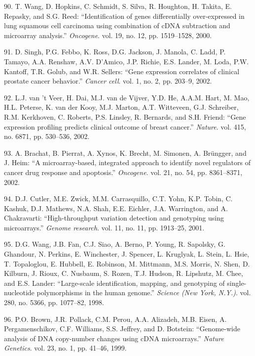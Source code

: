 \documentclass[12pt,twoside]{reedthesis}
\theoremstyle{definition}
\theoremstyle{definition}
\theoremstyle{remark}
\begin{document}
  \hypertarget{ref-Wang2000}{}
  90. T. Wang, D. Hopkins, C. Schmidt, S. Silva, R. Houghton, H. Takita,
  E. Repasky, and S.G. Reed: ``Identification of genes differentially
  over-expressed in lung squamous cell carcinoma using combination of cDNA
  subtraction and microarray analysis.'' \emph{Oncogene}. vol. 19, no. 12,
  pp. 1519--1528, 2000.
  
  \hypertarget{ref-Singh2002}{}
  91. D. Singh, P.G. Febbo, K. Ross, D.G. Jackson, J. Manola, C. Ladd, P.
  Tamayo, A.A. Renshaw, A.V. D'Amico, J.P. Richie, E.S. Lander, M. Loda,
  P.W. Kantoff, T.R. Golub, and W.R. Sellers: ``Gene expression correlates
  of clinical prostate cancer behavior.'' \emph{Cancer cell}. vol. 1, no.
  2, pp. 203--9, 2002.
  
  \hypertarget{ref-VantVeer2002}{}
  92. L.J. van 't Veer, H. Dai, M.J. van de Vijver, Y.D. He, A.A.M. Hart,
  M. Mao, H.L. Peterse, K. van der Kooy, M.J. Marton, A.T. Witteveen, G.J.
  Schreiber, R.M. Kerkhoven, C. Roberts, P.S. Linsley, R. Bernards, and
  S.H. Friend: ``Gene expression profiling predicts clinical outcome of
  breast cancer.'' \emph{Nature}. vol. 415, no. 6871, pp. 530--536, 2002.
  
  \hypertarget{ref-Brachat2002}{}
  93. A. Brachat, B. Pierrat, A. Xynos, K. Brecht, M. Simonen, A.
  Brüngger, and J. Heim: ``A microarray-based, integrated approach to
  identify novel regulators of cancer drug response and apoptosis.''
  \emph{Oncogene}. vol. 21, no. 54, pp. 8361--8371, 2002.
  
  \hypertarget{ref-Cutler2001}{}
  94. D.J. Cutler, M.E. Zwick, M.M. Carrasquillo, C.T. Yohn, K.P. Tobin,
  C. Kashuk, D.J. Mathews, N.A. Shah, E.E. Eichler, J.A. Warrington, and
  A. Chakravarti: ``High-throughput variation detection and genotyping
  using microarrays.'' \emph{Genome research}. vol. 11, no. 11, pp.
  1913--25, 2001.
  
  \hypertarget{ref-Wang1998}{}
  95. D.G. Wang, J.B. Fan, C.J. Siao, A. Berno, P. Young, R. Sapolsky, G.
  Ghandour, N. Perkins, E. Winchester, J. Spencer, L. Kruglyak, L. Stein,
  L. Hsie, T. Topaloglou, E. Hubbell, E. Robinson, M. Mittmann, M.S.
  Morris, N. Shen, D. Kilburn, J. Rioux, C. Nusbaum, S. Rozen, T.J.
  Hudson, R. Lipshutz, M. Chee, and E.S. Lander: ``Large-scale
  identification, mapping, and genotyping of single-nucleotide
  polymorphisms in the human genome.'' \emph{Science (New York, N.Y.)}.
  vol. 280, no. 5366, pp. 1077--82, 1998.
  
  \hypertarget{ref-Brown1999}{}
  96. P.O. Brown, J.R. Pollack, C.M. Perou, A.A. Alizadeh, M.B. Eisen, A.
  Pergamenschikov, C.F. Williams, S.S. Jeffrey, and D. Botstein:
  ``Genome-wide analysis of DNA copy-number changes using cDNA
  microarrays.'' \emph{Nature Genetics}. vol. 23, no. 1, pp. 41--46, 1999.
  
\end{document}
